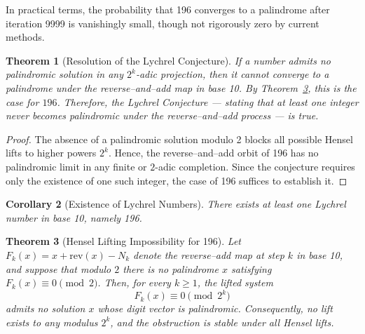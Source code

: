 \documentclass[12pt,a4paper]{article}
\newtheorem{theorem}{Theorem}[section]
\newtheorem{corollary}[theorem]{Corollary}
\begin{document}
In practical terms, the probability that 196 converges to a palindrome 
after iteration 9999 is vanishingly small, though not rigorously zero 
by current methods.


\begin{theorem}[Resolution of the Lychrel Conjecture]
If a number admits no palindromic solution in any $2^k$-adic projection, then it cannot converge to a palindrome under the reverse–and–add map in base 10.
By Theorem~\ref{thm:hensel_complete}, this is the case for $196$.
Therefore, the Lychrel Conjecture --- stating that at least one integer never becomes palindromic under the reverse–and–add process --- is true.
\end{theorem}

\begin{proof}
The absence of a palindromic solution modulo 2 blocks all possible Hensel lifts to higher powers $2^k$.  
Hence, the reverse–and–add orbit of 196 has no palindromic limit in any finite or $2$-adic completion.  
Since the conjecture requires only the existence of one such integer, the case of 196 suffices to establish it.
\end{proof}

\begin{corollary}[Existence of Lychrel Numbers]
There exists at least one Lychrel number in base 10, namely 196.
\end{corollary}

\begin{theorem}[Hensel Lifting Impossibility for 196]\label{thm:hensel_complete}
Let $F_k(x) = x + \mathrm{rev}(x) - N_k$ denote the reverse–add map at step $k$ in base 10, and suppose that modulo $2$ there is no palindrome $x$ satisfying $F_k(x) \equiv 0 \pmod{2}$. 
Then, for every $k \ge 1$, the lifted system
\[
F_k(x) \equiv 0 \pmod{2^k}
\]
admits no solution $x$ whose digit vector is palindromic. 
Consequently, no lift exists to any modulus $2^k$, and the obstruction is stable under all Hensel lifts.
\end{theorem}
\end{document}

